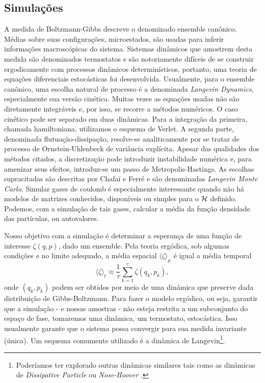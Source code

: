 \documentclass[12pt]{report}
\begin{document}
\subsection{Simulações}
A medida de Boltzmann-Gibbs descreve o denominado ensemble canônico. Médias sobre suas configurações, microestados, são usadas para inferir informações macroscópicas do sistema. Sistemas dinâmicos que amostrem desta medida são denominados termostatos e são notoriamente difíceis de se construir ergodicamente com processos dinâmicos determinísticos, portanto, uma teoria de equações diferenciais estocásticas foi desenvolvida. Usualmente, para o ensemble canônico, uma escolha natural de processo é a denominada \textit{Langevin Dynamics}, \cite[Capítulo~6]{leimmolecular} especialmente sua versão cinética. Muitas vezes as equações usadas não são diretamente integráveis e, por isso, se recorre a métodos numéricos. O caso cinético pode ser separado em duas dinâmicas. Para a integração da primeira, chamada hamiltoniana, utilizamos o esquema de Verlet. A segunda parte, denominada flutuação-dissipação, resolve-se analiticamente por se tratar de processo de Ornstein-Uhlenbeck de variância explícita. Apesar das qualidades dos métodos citados, a discretização pode introduzir instabilidade numérica e, para amenizar seus efeitos, introduz-se um passo de Metropolis-Hastings.  \cite[Apêndice~C]{leimmolecular} As escolhas supracitadas são descritas por Chafa\"{i} e Ferré \cite{Chafa2018} e são denominadas \textit{Langevin Monte Carlo}. Simular gases de coulomb é especialmente interessante quando não há modelos de matrizes conhecidos, disponíveis ou simples para o $\operatorname{\mathcal{H}}$ definido. Podemos, com a simulação de tais gases, calcular a média da função densidade das partículas, ou autovalores.

Nosso objetivo com a simulação é determinar a esperança de uma função de interesse $\zeta(q,p)$, dado um ensemble. Pela teoria ergódica, sob algumas condições e no limite adequado, a média espacial $\langle \zeta \rangle_{\mu}$ é igual a média temporal $$\langle \zeta \rangle_t \approx \frac{1}{\tau} \sum_{k=1}^{\tau} \zeta(q_k, p_k),$$ onde $(q_k, p_k)$ podem ser obtidos por meio de uma dinâmica que preserve dada distribuição de Gibbs-Boltzmann. Para fazer o modelo ergódico, ou seja, garantir que a simulação - e nossas amostras - não esteja restrita a um subconjunto do espaço de fase, tomaremos uma dinâmica, um termostato, estocástica. Isso usualmente garante que o sistema possa convergir para sua medida invariante (única). Um esquema comumente utilizado é a dinâmica de Langevin\footnote{Poderíamos ter explorado outras dinâmicas similares tais como as dinâmicas de \textit{Dissipative Particle} \cite{DPD} ou \textit{Nose-Hoover} \cite{Hoover}.}.
\end{document}

